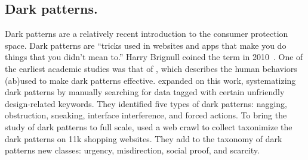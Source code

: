 

\subsection{Dark patterns.}

Dark patterns are a relatively recent introduction to the consumer protection space. Dark patterns are ``tricks used in websites and apps that make you do things that you didn't mean to.'' Harry Brignull coined the term in 2010~\cite{darkpatternsorg}. One of the earliest academic studies was that of \citet{greenberg2014dark}, which describes the human behaviors (ab)used to make dark patterns effective. \citet{gray2018dark} expanded on this work, systematizing dark patterns by manually searching for data tagged with certain unfriendly design-related keywords. They identified five types of dark patterns: nagging, obstruction, sneaking, interface interference, and forced actions. To bring the study of dark patterns to full scale, \citet{mathur2019dark} used a web crawl to collect taxonimize the dark patterns on 11k shopping websites. They add to the taxonomy of dark patterns new classes: urgency, misdirection, social proof, and scarcity.







